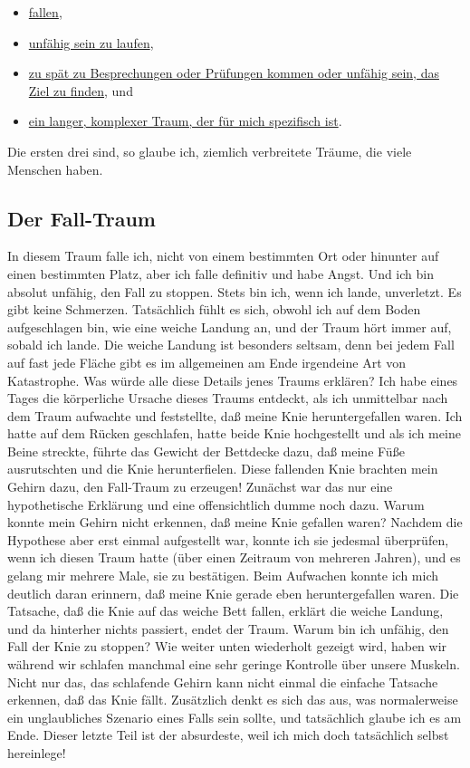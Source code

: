 \begin{itemize}
	\item \hyperlink{c3_5b}{fallen},
	\item \hyperlink{c3_5c}{unfähig sein zu laufen},
	\item \hyperlink{c3_5d}{zu spät zu Besprechungen oder Prüfungen kommen oder unfähig sein, das Ziel zu finden}, und
	\item \hyperlink{c3_5e}{ein langer, komplexer Traum, der für mich spezifisch ist}.
\end{itemize}

Die ersten drei sind, so glaube ich, ziemlich verbreitete Träume, die viele Menschen haben.
 \hypertarget{c3_5b}{}

\subsection{Der Fall-Traum}

In diesem Traum falle ich, nicht von einem bestimmten Ort oder hinunter auf einen bestimmten Platz, aber ich falle definitiv und habe Angst.
 Und ich bin absolut unfähig, den Fall zu stoppen.
 Stets bin ich, wenn ich lande, unverletzt.
 Es gibt keine Schmerzen.
 Tatsächlich fühlt es sich, obwohl ich auf dem Boden aufgeschlagen bin, wie eine weiche Landung an, und der Traum hört immer auf, sobald ich lande.
 Die weiche Landung ist besonders seltsam, denn bei jedem Fall auf fast jede Fläche gibt es im allgemeinen am Ende irgendeine Art von Katastrophe.
 Was würde alle diese Details jenes Traums erklären?
 Ich habe eines Tages die körperliche Ursache dieses Traums entdeckt, als ich unmittelbar nach dem Traum aufwachte und feststellte, daß meine Knie heruntergefallen waren.
 Ich hatte auf dem Rücken geschlafen, hatte beide Knie hochgestellt und als ich meine Beine streckte, führte das Gewicht der Bettdecke dazu, daß meine Füße ausrutschten und die Knie herunterfielen.
 Diese fallenden Knie brachten mein Gehirn dazu, den Fall-Traum zu erzeugen!
 Zunächst war das nur eine hypothetische Erklärung und eine offensichtlich dumme noch dazu.
 Warum konnte mein Gehirn nicht erkennen, daß meine Knie gefallen waren?
 Nachdem die Hypothese aber erst einmal aufgestellt war, konnte ich sie jedesmal überprüfen, wenn ich diesen Traum hatte (über einen Zeitraum von mehreren Jahren), und es gelang mir mehrere Male, sie zu bestätigen.
 Beim Aufwachen konnte ich mich deutlich daran erinnern, daß meine Knie gerade eben heruntergefallen waren.
 Die Tatsache, daß die Knie auf das weiche Bett fallen, erklärt die weiche Landung, und da hinterher nichts passiert, endet der Traum.
 Warum bin ich unfähig, den Fall der Knie zu stoppen?
 Wie weiter unten wiederholt gezeigt wird, haben wir während wir schlafen manchmal eine sehr geringe Kontrolle über unsere Muskeln.
 Nicht nur das, das schlafende Gehirn kann nicht einmal die einfache Tatsache erkennen, daß das Knie fällt.
 Zusätzlich denkt es sich das aus, was normalerweise ein unglaubliches Szenario eines Falls sein sollte, und tatsächlich glaube ich es am Ende.
 Dieser letzte Teil ist der absurdeste, weil ich mich doch tatsächlich selbst hereinlege!
 \hypertarget{c3_5c}{}

